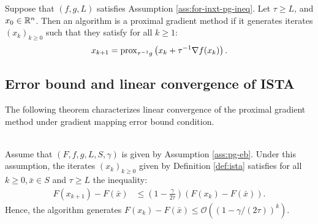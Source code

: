 \documentclass[12pt]{article}
\begin{document}
    \begin{definition}\label{def:ista}
        Suppose that $(f, g, L)$ satisfies Assumption \ref{ass:for-inxt-pg-ineq}. 
        Let $\tau \ge L$, and $x_0 \in \mathbb R^n$. 
        Then an algorithm is a proximal gradient method if it generates iterates $(x_k)_{k \ge 0}$ such that they satisfy for all $k \ge 1$: 
        \begin{align*}
            x_{k + 1} = \operatorname{prox}_{\tau^{-1} g}\left(x_k + \tau^{-1}\nabla f(x_k)\right). 
        \end{align*}
    \end{definition}
    \subsection{Error bound and linear convergence of ISTA}
        The following theorem characterizes linear convergence of the proximal gradient method under gradient mapping error bound condition. 
        \begin{theorem}\;\label{thm:lin-cnvg-ista-eb}\\
            Assume that $(F, f, g, L, S, \gamma)$ is given by Assumption \ref{ass:pg-eb}. 
            Under this assumption, the iterates $(x_k)_{k \ge 0}$ given by Definition \ref{def:ista} satisfies for all $k \ge 0, \bar x \in S$ and $\tau \ge L$ the inequality: 
            \begin{align*}
                F(x_{k + 1}) - F(\bar x)
                &\le 
                \left(
                    1 - \frac{\gamma}{2\tau}
                \right)(F(x_k) - F(\bar x)). 
            \end{align*}
            Hence, the algorithm generates $F(x_k) - F(\bar x)\le \mathcal O((1 - \gamma/(2\tau))^k)$. 
        \end{theorem}
\end{document}
